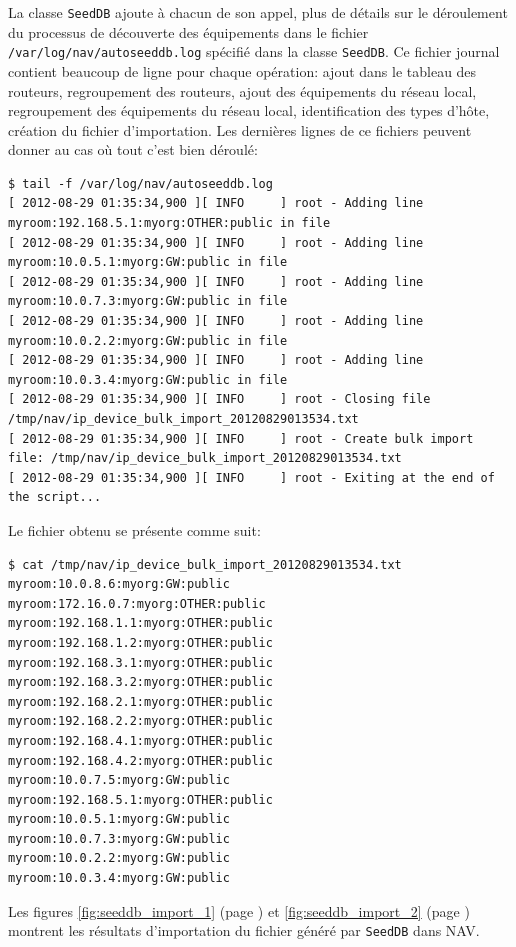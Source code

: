 La classe \texttt{SeedDB} ajoute à chacun de son appel, plus de détails sur le déroulement du processus de découverte des équipements dans le fichier \texttt{/var/log/nav/autoseeddb.log} spécifié dans la classe \texttt{SeedDB}. Ce fichier journal contient beaucoup de ligne pour chaque opération: ajout dans le tableau des routeurs, regroupement des routeurs, ajout des équipements du réseau local, regroupement des équipements du réseau local, identification des types d'hôte, création du fichier d'importation. Les dernières lignes de ce fichiers peuvent donner au cas où tout c'est bien déroulé:
\begin{lstlisting}[frame=single] 
$ tail -f /var/log/nav/autoseeddb.log 
[ 2012-08-29 01:35:34,900 ][ INFO     ] root - Adding line myroom:192.168.5.1:myorg:OTHER:public in file
[ 2012-08-29 01:35:34,900 ][ INFO     ] root - Adding line myroom:10.0.5.1:myorg:GW:public in file
[ 2012-08-29 01:35:34,900 ][ INFO     ] root - Adding line myroom:10.0.7.3:myorg:GW:public in file
[ 2012-08-29 01:35:34,900 ][ INFO     ] root - Adding line myroom:10.0.2.2:myorg:GW:public in file
[ 2012-08-29 01:35:34,900 ][ INFO     ] root - Adding line myroom:10.0.3.4:myorg:GW:public in file
[ 2012-08-29 01:35:34,900 ][ INFO     ] root - Closing file /tmp/nav/ip_device_bulk_import_20120829013534.txt
[ 2012-08-29 01:35:34,900 ][ INFO     ] root - Create bulk import file: /tmp/nav/ip_device_bulk_import_20120829013534.txt
[ 2012-08-29 01:35:34,900 ][ INFO     ] root - Exiting at the end of the script...
\end{lstlisting} 

Le fichier obtenu se présente comme suit:
\begin{lstlisting}[frame=single] 
$ cat /tmp/nav/ip_device_bulk_import_20120829013534.txt
myroom:10.0.8.6:myorg:GW:public
myroom:172.16.0.7:myorg:OTHER:public
myroom:192.168.1.1:myorg:OTHER:public
myroom:192.168.1.2:myorg:OTHER:public
myroom:192.168.3.1:myorg:OTHER:public
myroom:192.168.3.2:myorg:OTHER:public
myroom:192.168.2.1:myorg:OTHER:public
myroom:192.168.2.2:myorg:OTHER:public
myroom:192.168.4.1:myorg:OTHER:public
myroom:192.168.4.2:myorg:OTHER:public
myroom:10.0.7.5:myorg:GW:public
myroom:192.168.5.1:myorg:OTHER:public
myroom:10.0.5.1:myorg:GW:public
myroom:10.0.7.3:myorg:GW:public
myroom:10.0.2.2:myorg:GW:public
myroom:10.0.3.4:myorg:GW:public
\end{lstlisting}
Les figures \ref{fig:seeddb_import_1} (page \pageref{fig:seeddb_import_1}) et \ref{fig:seeddb_import_2} (page \pageref{fig:seeddb_import_2}) montrent les résultats d'importation du fichier généré par \texttt{SeedDB} dans NAV.

